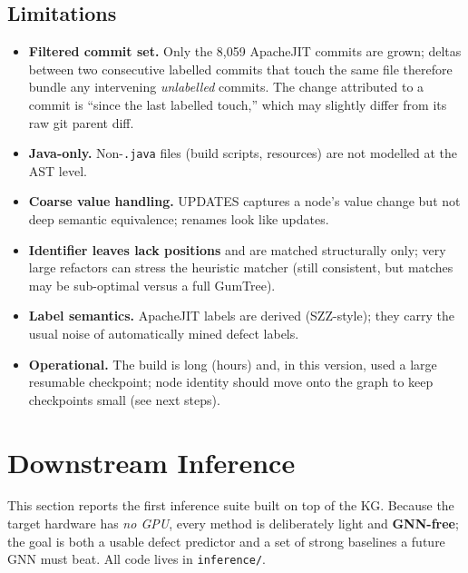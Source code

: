 \documentclass[11pt,a4paper]{article}
\newcommand{\edge}[1]{\textsc{#1}}
\begin{document}
\subsection*{Limitations}
\begin{itemize}[nosep]
  \item \textbf{Filtered commit set.} Only the 8{,}059 ApacheJIT commits are
        grown; deltas between two consecutive labelled commits that touch the
        same file therefore bundle any intervening \emph{unlabelled} commits.
        The change attributed to a commit is ``since the last labelled touch,''
        which may slightly differ from its raw git parent diff.
  \item \textbf{Java-only.} Non-\texttt{.java} files (build scripts, resources)
        are not modelled at the AST level.
  \item \textbf{Coarse value handling.} \edge{UPDATES} captures a node's value
        change but not deep semantic equivalence; renames look like updates.
  \item \textbf{Identifier leaves lack positions} and are matched structurally
        only; very large refactors can stress the heuristic matcher (still
        consistent, but matches may be sub-optimal versus a full GumTree).
  \item \textbf{Label semantics.} ApacheJIT labels are derived (SZZ-style); they
        carry the usual noise of automatically mined defect labels.
  \item \textbf{Operational.} The build is long (hours) and, in this version,
        used a large resumable checkpoint; node identity should move onto the
        graph to keep checkpoints small (see next steps).
\end{itemize}

\section{Downstream Inference}\label{sec:inference}
This section reports the first inference suite built on top of the KG. Because
the target hardware has \emph{no GPU}, every method is deliberately light and
\textbf{GNN-free}; the goal is both a usable defect predictor and a set of strong
baselines a future GNN must beat. All code lives in \texttt{inference/}.
\end{document}
